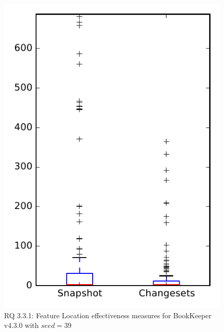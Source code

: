 
\begin{figure}
\centering
\includegraphics[height=0.4\textheight]{figures/flt_seed/rq1_bookkeeper_39}
\caption{RQ 3.3.1: Feature Location effectiveness measures for BookKeeper v4.3.0 with $seed=39$}
\label{fig:flt_seed:rq1:bookkeeper}
\end{figure}
